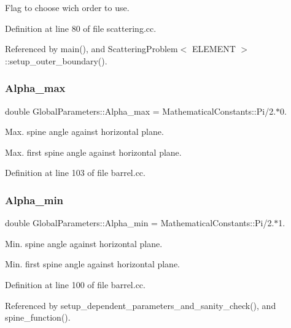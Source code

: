 Flag to choose wich order to use. 



Definition at line 80 of file scattering.\+cc.



Referenced by main(), and Scattering\+Problem$<$ E\+L\+E\+M\+E\+N\+T $>$\+::setup\+\_\+outer\+\_\+boundary().

\mbox{\label{namespaceGlobalParameters_a19d04a02b0b5ef5c72e9c30d822e4dc7}} 
\subsubsection{\texorpdfstring{Alpha\+\_\+max}{Alpha\_max}}
{\footnotesize\ttfamily double Global\+Parameters\+::\+Alpha\+\_\+max = Mathematical\+Constants\+::\+Pi/2.$\ast$0.}



Max. spine angle against horizontal plane. 

Max. first spine angle against horizontal plane. 

Definition at line 103 of file barrel.\+cc.

\mbox{\label{namespaceGlobalParameters_ae8fa7610a34b7a2a8223eade99a5c22f}} 
\subsubsection{\texorpdfstring{Alpha\+\_\+min}{Alpha\_min}}
{\footnotesize\ttfamily double Global\+Parameters\+::\+Alpha\+\_\+min = Mathematical\+Constants\+::\+Pi/2.$\ast$1.}



Min. spine angle against horizontal plane. 

Min. first spine angle against horizontal plane. 

Definition at line 100 of file barrel.\+cc.



Referenced by setup\+\_\+dependent\+\_\+parameters\+\_\+and\+\_\+sanity\+\_\+check(), and spine\+\_\+function().

\mbox{\label{namespaceGlobalParameters_aa34aff6eb29a2a1245e9ffc2fac42caa}} 
